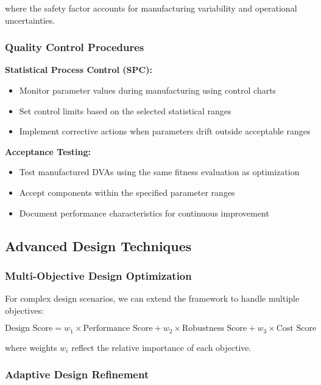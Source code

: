 \documentclass[12pt,a4paper]{article}
\begin{document}
where the safety factor accounts for manufacturing variability and operational uncertainties.

\subsubsection{Quality Control Procedures}

\textbf{Statistical Process Control (SPC):}
\begin{itemize}
    \item Monitor parameter values during manufacturing using control charts
    \item Set control limits based on the selected statistical ranges
    \item Implement corrective actions when parameters drift outside acceptable ranges
\end{itemize}

\textbf{Acceptance Testing:}
\begin{itemize}
    \item Test manufactured DVAs using the same fitness evaluation as optimization
    \item Accept components within the specified parameter ranges
    \item Document performance characteristics for continuous improvement
\end{itemize}

\subsection{Advanced Design Techniques}

\subsubsection{Multi-Objective Design Optimization}

For complex design scenarios, we can extend the framework to handle multiple objectives:

\begin{equation}
\text{Design Score} = w_1 \times \text{Performance Score} + w_2 \times \text{Robustness Score} + w_3 \times \text{Cost Score}
\end{equation}

where weights $w_i$ reflect the relative importance of each objective.

\subsubsection{Adaptive Design Refinement}
\end{document}
